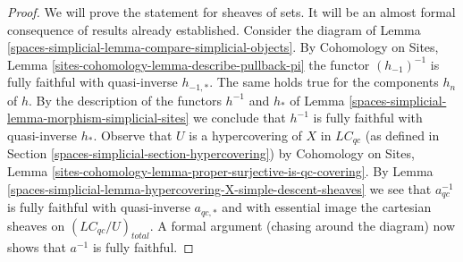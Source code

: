 \begin{proof}
We will prove the statement for sheaves of sets. It will be an
almost formal consequence of results already established.
Consider the diagram of Lemma \ref{spaces-simplicial-lemma-compare-simplicial-objects}.
By Cohomology on Sites, Lemma \ref{sites-cohomology-lemma-describe-pullback-pi}
the functor $(h_{-1})^{-1}$ is fully faithful with quasi-inverse $h_{-1, *}$.
The same holds true for the components $h_n$ of $h$.
By the description of the functors $h^{-1}$ and $h_*$ of
Lemma \ref{spaces-simplicial-lemma-morphism-simplicial-sites}
we conclude that $h^{-1}$ is fully faithful with quasi-inverse $h_*$.
Observe that $U$ is a hypercovering of $X$ in $\textit{LC}_{qc}$
(as defined in Section \ref{spaces-simplicial-section-hypercovering}) by
Cohomology on Sites, Lemma
\ref{sites-cohomology-lemma-proper-surjective-is-qc-covering}.
By Lemma \ref{spaces-simplicial-lemma-hypercovering-X-simple-descent-sheaves}
we see that $a_{qc}^{-1}$ is fully faithful with quasi-inverse $a_{qc, *}$
and with essential image the cartesian sheaves on
$(\textit{LC}_{qc}/U)_{total}$.
A formal argument (chasing around the diagram) now shows that
$a^{-1}$ is fully faithful.


\end{proof}
